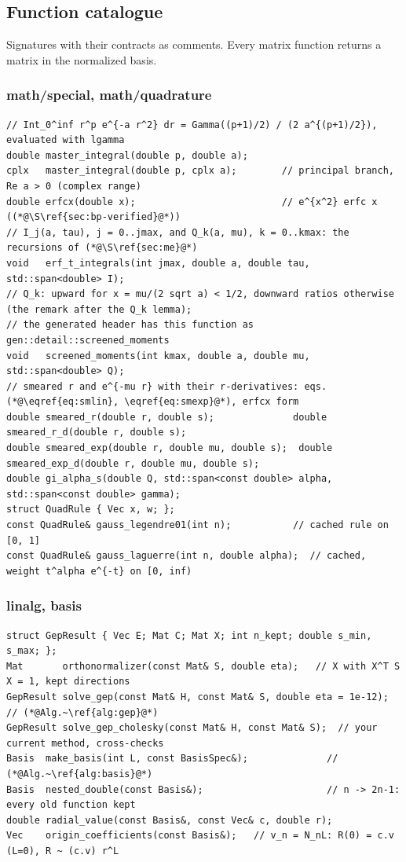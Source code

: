 \documentclass[11pt,a4paper]{article}
\numberwithin{equation}{section}
\theoremstyle{definition}
\theoremstyle{plain}
\theoremstyle{remark}
\numberwithin{algorithm}{section}
\begin{document}
\subsection{Function catalogue}\label{sec:bp-catalogue}
Signatures with their contracts as comments. Every matrix function returns a matrix in the normalized basis.

\subsubsection*{math/special, math/quadrature}
\begin{lstlisting}[style=cpp]
// Int_0^inf r^p e^{-a r^2} dr = Gamma((p+1)/2) / (2 a^{(p+1)/2}), evaluated with lgamma
double master_integral(double p, double a);
cplx   master_integral(double p, cplx a);        // principal branch, Re a > 0 (complex range)
double erfcx(double x);                          // e^{x^2} erfc x ((*@\S\ref{sec:bp-verified}@*))
// I_j(a, tau), j = 0..jmax, and Q_k(a, mu), k = 0..kmax: the recursions of (*@\S\ref{sec:me}@*)
void   erf_t_integrals(int jmax, double a, double tau, std::span<double> I);
// Q_k: upward for x = mu/(2 sqrt a) < 1/2, downward ratios otherwise (the remark after the Q_k lemma);
// the generated header has this function as gen::detail::screened_moments
void   screened_moments(int kmax, double a, double mu, std::span<double> Q);
// smeared r and e^{-mu r} with their r-derivatives: eqs. (*@\eqref{eq:smlin}, \eqref{eq:smexp}@*), erfcx form
double smeared_r(double r, double s);              double smeared_r_d(double r, double s);
double smeared_exp(double r, double mu, double s);  double smeared_exp_d(double r, double mu, double s);
double gi_alpha_s(double Q, std::span<const double> alpha, std::span<const double> gamma);
struct QuadRule { Vec x, w; };
const QuadRule& gauss_legendre01(int n);           // cached rule on [0, 1]
const QuadRule& gauss_laguerre(int n, double alpha);  // cached, weight t^alpha e^{-t} on [0, inf)
\end{lstlisting}

\subsubsection*{linalg, basis}
\begin{lstlisting}[style=cpp]
struct GepResult { Vec E; Mat C; Mat X; int n_kept; double s_min, s_max; };
Mat       orthonormalizer(const Mat& S, double eta);   // X with X^T S X = 1, kept directions
GepResult solve_gep(const Mat& H, const Mat& S, double eta = 1e-12);   // (*@Alg.~\ref{alg:gep}@*)
GepResult solve_gep_cholesky(const Mat& H, const Mat& S);  // your current method, cross-checks
Basis  make_basis(int L, const BasisSpec&);              // (*@Alg.~\ref{alg:basis}@*)
Basis  nested_double(const Basis&);                      // n -> 2n-1: every old function kept
double radial_value(const Basis&, const Vec& c, double r);
Vec    origin_coefficients(const Basis&);   // v_n = N_nL: R(0) = c.v (L=0), R ~ (c.v) r^L
\end{lstlisting}
\end{document}
